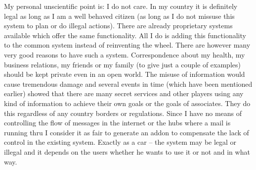 My personal unscientific point is: I do not care. In my country it is definitely legal as long as I am a well behaved citizen (as long as I do not missuse this system to plan or do illegal actions). There are already proprietary systems available which offer the same functionality. All I do is adding this functionality to the common system instead of reinventing the wheel. There are however many very good reasons to have such a system. Correspondence about my health, my business relations, my friends or my family (to give just a couple of examples) should be kept private even in an open world. The misuse of information would cause tremendous damage and several events in time (which have been mentioned earlier) showed that there are many secret services and other players using any kind of information to achieve their own goals or the goals of associates. They do this regardless of any country borders or regulations. Since I have no means of controlling the flow of messages in the internet or the hubs where a mail is running thru I consider it as fair to generate an addon to compensate the lack of control in the existing system. Exactly as a car -- the system may be legal or illegal and it depends on the users whether he wants to use it or not and in what way.\par
